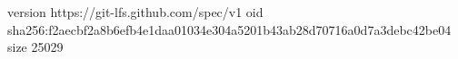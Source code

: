 version https://git-lfs.github.com/spec/v1
oid sha256:f2aecbf2a8b6efb4e1daa01034e304a5201b43ab28d70716a0d7a3debc42be04
size 25029
